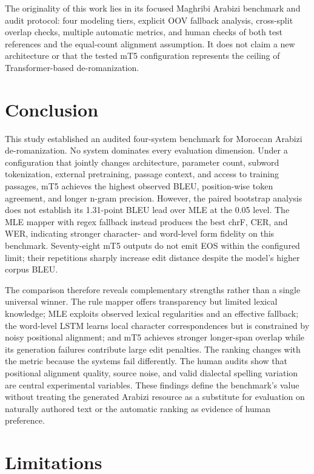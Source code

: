 \documentclass[runningheads]{llncs}
\begin{document}
The originality of this work lies in its focused Maghribi Arabizi benchmark and audit protocol: four modeling tiers, explicit OOV fallback analysis, cross-split overlap checks, multiple automatic metrics, and human checks of both test references and the equal-count alignment assumption. It does not claim a new architecture or that the tested mT5 configuration represents the ceiling of Transformer-based de-romanization.

\section{Conclusion}

This study established an audited four-system benchmark for Moroccan Arabizi de-romanization. No system dominates every evaluation dimension. Under a configuration that jointly changes architecture, parameter count, subword tokenization, external pretraining, passage context, and access to training passages, mT5 achieves the highest observed BLEU, position-wise token agreement, and longer n-gram precision. However, the paired bootstrap analysis does not establish its 1.31-point BLEU lead over MLE at the 0.05 level. The MLE mapper with regex fallback instead produces the best chrF, CER, and WER, indicating stronger character- and word-level form fidelity on this benchmark. Seventy-eight mT5 outputs do not emit EOS within the configured limit; their repetitions sharply increase edit distance despite the model's higher corpus BLEU.

The comparison therefore reveals complementary strengths rather than a single universal winner. The rule mapper offers transparency but limited lexical knowledge; MLE exploits observed lexical regularities and an effective fallback; the word-level LSTM learns local character correspondences but is constrained by noisy positional alignment; and mT5 achieves stronger longer-span overlap while its generation failures contribute large edit penalties. The ranking changes with the metric because the systems fail differently. The human audits show that positional alignment quality, source noise, and valid dialectal spelling variation are central experimental variables. These findings define the benchmark's value without treating the generated Arabizi resource as a substitute for evaluation on naturally authored text or the automatic ranking as evidence of human preference.

\section*{Limitations}
\end{document}
